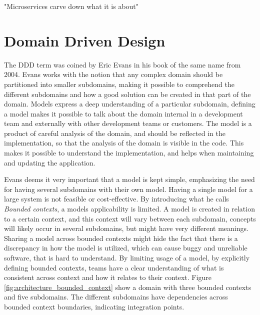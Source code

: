 "Microservices carve down what it is about"


\section{Domain Driven Design}
\label{sec:DDD}
The DDD term was coined by Eric Evans in his book of the same name from 2004\cite[preface]{evans2004domain}. Evans works with the notion that any complex domain should be partitioned into smaller subdomains, making it possible to comprehend the different subdomains and how a good solution can be created in that part of the domain. Models express a deep understanding of a particular subdomain, defining a model makes it possible to talk about the domain internal in a development team and externally with other development teams or customers. The model is a product of careful analysis of the domain, and should be reflected in the implementation, so that the analysis of the domain is visible in the code. This makes it possible to understand the implementation, and helps when maintaining and updating the application\cite[p.~2]{evans2004domain}.

Evans deems it very important that a model is kept simple, emphasizing the need for having several subdomains with their own model. Having a single model for a large system is not feasible or cost-effective\cite[p.~331]{evans2004domain}. By introducing what he calls \textit{Bounded contexts}, a models applicability is limited. A model is created in relation to a certain context, and this context will vary between each subdomain, concepts will likely occur in several subdomains, but might have very different meanings. Sharing a model across bounded contexts might hide the fact that there is a discrepancy in how the model is utilized, which can cause buggy and unreliable software, that is hard to understand. By limiting usage of a model, by explicitly defining bounded contexts, teams have a clear understanding of what is consistent across context and how it relates to their context\cite[p.~331]{evans2004domain}. Figure \ref{fig:architecture_bounded_context} show a domain with three bounded contexts and five subdomains. The different subdomains have dependencies across bounded context boundaries, indicating integration points.

